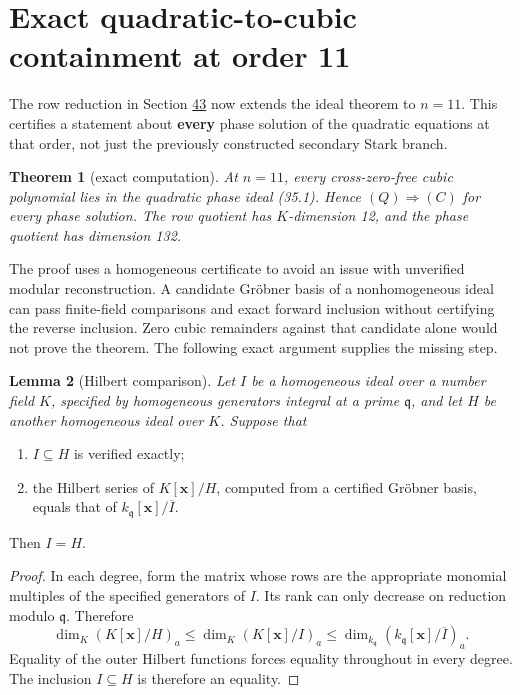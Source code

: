 \documentclass[11pt,reqno]{amsart}
\theoremstyle{plain}
\newtheorem{theorem}{Theorem}[section]
\newtheorem{lemma}[theorem]{Lemma}
\begin{document}
\section{Exact quadratic-to-cubic containment at order 11}\label{sec:45}

The row reduction in Section \hyperref[sec:43]{43} now extends the ideal theorem to
\(n=11\). This certifies a statement about \textbf{every} phase solution
of the quadratic equations at that order, not just the previously
constructed secondary Stark branch.

\begin{theorem}[exact computation]
At \(n=11\), every cross-zero-free
cubic polynomial lies in the quadratic phase ideal (35.1). Hence
\((Q)\Rightarrow(C)\) for every phase solution. The row quotient
has \(K\)-dimension 12, and the phase quotient has dimension 132.
\end{theorem}

The proof uses a homogeneous certificate to avoid an issue with
unverified modular reconstruction. A candidate Gr\"obner basis of a
nonhomogeneous ideal can pass finite-field comparisons and exact
forward inclusion without certifying the reverse inclusion. Zero
cubic remainders against that candidate alone would not prove the
theorem. The following exact argument supplies the missing step.

\begin{lemma}[Hilbert comparison]
Let \(I\) be a homogeneous ideal over a
number field \(K\), specified by homogeneous generators integral at a
prime \(\mathfrak q\), and let \(H\) be another homogeneous ideal over
\(K\). Suppose that
\end{lemma}

\begin{enumerate}
\item \(I\subseteq H\) is verified exactly;
\item the Hilbert series of \(K[\mathbf x]/H\), computed from a certified
Gr\"obner basis, equals that of
\(k_{\mathfrak q}[\mathbf x]/\overline I\).
\end{enumerate}

Then \(I=H\).

\begin{proof}
In each degree, form the matrix whose rows are the appropriate
monomial multiples of the specified generators of \(I\). Its rank
can only decrease on reduction modulo \(\mathfrak q\). Therefore
\[
 \dim_K(K[\mathbf x]/H)_a
 \le \dim_K(K[\mathbf x]/I)_a
 \le \dim_{k_{\mathfrak q}}
       (k_{\mathfrak q}[\mathbf x]/\overline I)_a.
\]
Equality of the outer Hilbert functions forces equality throughout
in every degree. The inclusion \(I\subseteq H\) is therefore an
equality.
\end{proof}
\end{document}
